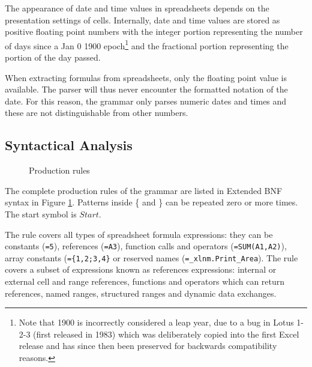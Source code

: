 The appearance of date and time values in spreadsheets depends on the presentation settings of cells. Internally, date and time values are stored as positive floating point numbers with the integer portion representing the number of days since a Jan 0 1900 epoch\footnote{Note that 1900 is incorrectly considered a leap year, due to a bug in Lotus 1-2-3 (first released in 1983) which was deliberately copied into the first Excel release and has since then been preserved for backwards compatibility reasons.} and the fractional portion representing the portion of the day passed.

When extracting formulas from spreadsheets, only the floating point value is available.
The parser will thus never encounter the formatted notation of the date.
For this reason, the grammar only parses numeric dates and times and these are not distinguishable from other numbers.

\newpage

\subsection{Syntactical Analysis}

\begin{figure}
\small
\begin{multicols*}{2}

\end{multicols*}
\caption{Production rules}
\label{figure:productions}
\end{figure}

The complete production rules of the grammar are listed in Extended BNF syntax in Figure \ref{figure:productions}.
Patterns inside \{ and \} can be repeated zero or more times.
The start symbol is $Start$.

The  rule covers all types of spreadsheet formula expressions: they can be constants (\texttt{=5}), references (\texttt{=A3}), function calls and operators (\texttt{=SUM(A1,A2)}), array constants (\texttt{=\{1,2;3,4\}} or reserved names (\texttt{=_xlnm.Print_Area}).
The  rule covers a subset of expressions known as references expressions: internal or external cell and range references, functions and operators which can return references, named ranges, structured ranges and dynamic data exchanges.

%	
%
%	

